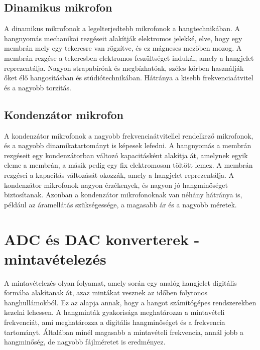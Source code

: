 \subsection{Dinamikus mikrofon}
A dinamikus mikrofonok a legelterjedtebb mikrofonok a hangtechnikában.
A hangnyomás mechanikai rezgéseit alakítják elektromos jelekké, elve, hogy egy membrán mely egy tekercsre van rögzítve, és ez mágneses mezőben mozog.
A membrán rezgése a tekercsben elektromos feszültséget indukál, amely a hangjelet reprezentálja.
Nagyon strapabíróak és megbízhatóak, széles körben használják őket élő hangosításban és stúdiótechnikában.
Hátránya a kisebb frekvenciaátvitel és a nagyobb torzítás.
 
\subsection{Kondenzátor mikrofon}

A kondenzátor mikrofonok a nagyobb frekvenciaátvitellel rendelkező mikrofonok, és a nagyobb dinamikatartományt is képesek lefedni.
A hangnyomás a membrán rezgéseit egy kondenzátorban változó kapacitásként alakítja át, amelynek egyik eleme a membrán, a másik pedig egy fix elektromosan töltött lemez.
A membrán rezgései a kapacitás változását okozzák, amely a hangjelet reprezentálja.
A kondenzátor mikrofonok nagyon érzékenyek, és nagyon jó hangminőséget biztosítanak.
Azonban a kondenzátor mikrofonoknak van néhány hátránya is, például az áramellátás szükségessége, a magasabb ár és a nagyobb méretek.

 
\section{ADC és DAC konverterek - mintavételezés}

A mintavételezés olyan folyamat, amely során egy analóg hangjelet digitális formába alakítanak át, azaz mintákat vesznek az időben folytonos hanghullámokból. 
Ez az alapja annak, hogy a hangot számítógépes rendszerekben kezelni lehessen. A hangminták gyakorisága meghatározza a mintavételi frekvenciát, 
ami meghatározza a digitális hangminőséget és a frekvencia tartományt. Általában minél magasabb a mintavételi frekvencia, annál jobb a hangminőség, 
de nagyobb fájlméretet is eredményez. 

